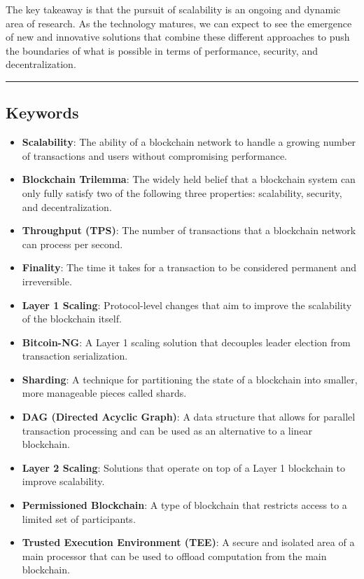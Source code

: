 The key takeaway is that the pursuit of scalability is an ongoing and
dynamic area of research. As the technology matures, we can expect to
see the emergence of new and innovative solutions that combine these
different approaches to push the boundaries of what is possible in terms
of performance, security, and decentralization.

\begin{center}\rule{0.5\linewidth}{0.5pt}\end{center}

\subsection{Keywords}\label{keywords}

\begin{itemize}
\tightlist
\item
  \textbf{Scalability}: The ability of a blockchain network to handle a
  growing number of transactions and users without compromising
  performance.
\item
  \textbf{Blockchain Trilemma}: The widely held belief that a blockchain
  system can only fully satisfy two of the following three properties:
  scalability, security, and decentralization.
\item
  \textbf{Throughput (TPS)}: The number of transactions that a
  blockchain network can process per second.
\item
  \textbf{Finality}: The time it takes for a transaction to be
  considered permanent and irreversible.
\item
  \textbf{Layer 1 Scaling}: Protocol-level changes that aim to improve
  the scalability of the blockchain itself.
\item
  \textbf{Bitcoin-NG}: A Layer 1 scaling solution that decouples leader
  election from transaction serialization.
\item
  \textbf{Sharding}: A technique for partitioning the state of a
  blockchain into smaller, more manageable pieces called shards.
\item
  \textbf{DAG (Directed Acyclic Graph)}: A data structure that allows
  for parallel transaction processing and can be used as an alternative
  to a linear blockchain.
\item
  \textbf{Layer 2 Scaling}: Solutions that operate on top of a Layer 1
  blockchain to improve scalability.
\item
  \textbf{Permissioned Blockchain}: A type of blockchain that restricts
  access to a limited set of participants.
\item
  \textbf{Trusted Execution Environment (TEE)}: A secure and isolated
  area of a main processor that can be used to offload computation from
  the main blockchain.
\end{itemize}

